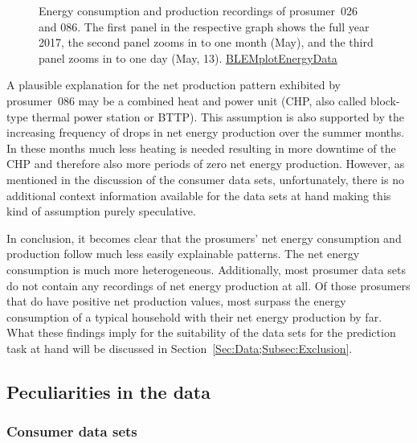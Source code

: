\begin{figure}
\caption[Energy consumption and production recordings of prosumer~026 and 086]{Energy consumption and production recordings of prosumer~026 and 086. The first panel in the respective graph shows the full year 2017, the second panel zooms in to one month (May), and the third panel zooms in to one day (May, 13). \quantnet\href{https://github.com/QuantLet/BLEM/tree/master/BLEMplotEnergyData}{BLEMplotEnergyData}}
\label{Fig:energyconsprod_p026p086}

\end{figure}
%
A plausible explanation for the net production pattern exhibited by prosumer~086 may be a combined heat and power unit (CHP, also called block-type thermal power station or BTTP). This assumption is also supported by the increasing frequency of drops in net energy production over the summer months. In these months much less heating is needed resulting in more downtime of the CHP and therefore also more periods of zero net energy production. However, as mentioned in the discussion of the consumer data sets, unfortunately, there is no additional context information available for the data sets at hand making this kind of assumption purely speculative.

In conclusion, it becomes clear that the prosumers' net energy consumption and production follow much less easily explainable patterns. The net energy consumption is much more heterogeneous. Additionally, most prosumer data sets do not contain any recordings of net energy production at all. Of those prosumers that do have positive net production values, most surpass the energy consumption of a typical household with their net energy production by far. What these findings imply for the suitability of the data sets for the prediction task at hand will be discussed in Section~\ref{Sec:Data;Subsec:Exclusion}.




\subsection{Peculiarities in the data}\label{Sec:Data;Subsec:Peculiarities}



\subsubsection{Consumer data sets}

